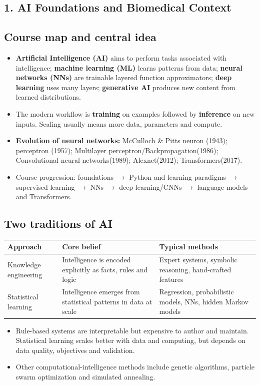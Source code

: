 \documentclass[10pt,a4paper]{ctexart}
\newcommand{\key}[1]{\textbf{#1}}
\begin{document}
\begin{multicols*}{2}
\sloppy

\section{1. AI Foundations and Biomedical Context}
\subsection{Course map and central idea}
\begin{itemize}
  \item \key{Artificial Intelligence (AI)} aims to perform tasks associated with intelligence; 
  \key{machine learning (ML)} learns patterns from data; \key{neural networks (NNs)} are trainable layered function approximators; 
  \key{deep learning} uses many layers; \key{generative AI} produces new content from learned distributions.
  \item The modern workflow is \key{training} on examples followed by \key{inference} on new inputs. 
  Scaling usually means more data, parameters and compute.
  \item \key{Evolution of neural networks:} McCulloch \& Pitts neuron (1943); perceptron (1957); 
  Multilayer perceptron/Backpropagation(1986); Convolutional neural networks(1989); Alexnet(2012); Transformers(2017).
  \item Course progression: foundations \(\rightarrow\) Python and learning paradigms \(\rightarrow\) supervised learning 
  \(\rightarrow\) NNs \(\rightarrow\) deep learning/CNNs \(\rightarrow\) language models and Transformers.
\end{itemize}

\subsection{Two traditions of AI}
\begin{center}\small
\begin{tabularx}{\linewidth}{@{}lYY@{}}
\toprule
Approach & Core belief & Typical methods\\ \midrule
Knowledge engineering & Intelligence is encoded explicitly as facts, rules and logic & Expert systems, symbolic reasoning, hand-crafted features\\
Statistical learning & Intelligence emerges from statistical patterns in data at scale & Regression, probabilistic models, NNs, hidden Markov models\\
\bottomrule
\end{tabularx}
\end{center}
\begin{itemize}
  \item Rule-based systems are interpretable but expensive to author and maintain. 
  Statistical learning scales better with data and computing, but depends on data quality, objectives and validation.
  \item Other computational-intelligence methods include genetic algorithms, particle swarm optimization and simulated annealing.
\end{itemize}


\end{multicols*}
\end{document}

